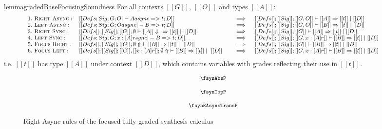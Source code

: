\begin{restatable}{lemma}{gradedBaseFocusingSoundness}
  For all contexts $[[ G ]]$, $[[ O ]]$ and types $[[ A ]]$:
  \begin{align*}
    {\footnotesize{
  \hspace{-3.5em}\begin{array}{lll}
   1.\ \textsc{Right Async}: & [[ Defs ; Sig; G ; O |- A async => t ; D ]] \quad &\implies \quad [[ Defs ]] ; [[ Sig ]] ; [[ G , O ]] \vdash [[ A ]] \Rightarrow [[ t ]] \mid [[ D ]]\\
   2.\ \textsc{Left Async}: & [[ Defs ; Sig; G ; O async |- B => t ; D ]] \quad &\implies \quad [[ Defs ]] ; [[ Sig ]]  ; [[ G , O ]] \vdash [[ B ]] \Rightarrow [[ t ]] \mid [[ D ]]\\
   3.\ \textsc{Right Sync}: & [[ Defs ]] ; [[ Sig ]] ; [[ G ]] ; \emptyset \vdash [[ A ]] \Downarrow\ \ \Rightarrow [[ t ]] \mid\  [[ D ]] \quad &\implies \quad [[ Defs ]] ; [[ Sig ]] ; [[ G ]] \vdash [[ A ]] \Rightarrow [[ t ]] \mid [[ D ]]\\
   4.\ \textsc{Left Sync}: & [[ Defs ; Sig ; G ; {x : [A] r} sync |- B => t ; D ]] \quad &\implies \quad [[ Defs ]] ; [[ Sig ]] ; [[ G, x : [ A] r ]] \vdash [[ B ]] \Rightarrow [[ t ]] \mid [[ D ]]\\
   5.\ \textsc{Focus Right}: & [[ Defs ]] ; [[ Sig ]] ; [[ G ]] ; \emptyset \Uparrow\ \vdash [[ B]] \Rightarrow [[ t]] \mid\ [[ D ]] \quad &\implies \quad [[ Defs ]] ; [[ Sig ]] ;  [[ G ]] \vdash [[ B ]] \Rightarrow [[ t ]] \mid [[ D ]]\\
   6.\ \textsc{Focus Left}: & [[ Defs ]] ; [[ Sig ]]; [[ G ]], [[ x : [A] r ]] ; \emptyset \Uparrow\ \vdash [[ B]] \Rightarrow [[t ]] \mid\ [[ D ]] \quad &\implies \quad [[ Defs ]] ; [[ Sig ]] ; [[ G, x : [A ] r ]] \vdash [[ B ]] \Rightarrow [[ t ]] \mid [[ D ]]
  \end{array}
    }}
  \end{align*}
i.e. $[[ t ]]$ has type $[[ A ]]$
under context $[[ D ]]$,
which contains variables with grades reflecting their use in $[[ t ]]$.
\label{lemma:graded-focus-sound}
  \end{restatable}

  \begin{figure}[H]
    \begin{align*}
      {\footnotesize{
  \begin{array}{c}
      \fsynAbsP
      \\[1.25em]
      \fsynTopP
      \\[1.25em]
      \fsynRAsyncTransP
    \end{array}
      }}
    \end{align*}
    \caption{Right Async rules of the focused fully graded synthesis calculus}
    \label{fig:focus-graded-right-async}
  \end{figure}

